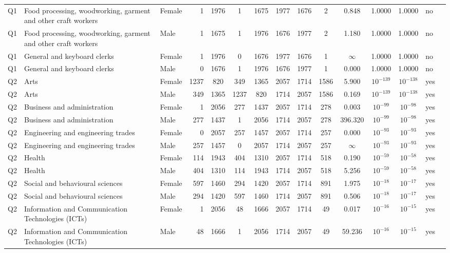 \begin{longtable}{lllrcccccccccll}
Q1 & Food processing, woodworking, garment and other craft workers & Female & 1 & 1976 & 1 & 1675 & 1977 & 1676 & 2 & 0.848 & 1.0000 & 1.0000 & no \\
Q1 & Food processing, woodworking, garment and other craft workers & Male & 1 & 1675 & 1 & 1976 & 1676 & 1977 & 2 & 1.180 & 1.0000 & 1.0000 & no \\
Q1 & General and keyboard clerks & Female & 1 & 1976 & 0 & 1676 & 1977 & 1676 & 1 & $\infty$ & 1.0000 & 1.0000 & no \\
Q1 & General and keyboard clerks & Male & 0 & 1676 & 1 & 1976 & 1676 & 1977 & 1 & 0.000 & 1.0000 & 1.0000 & no \\
Q2 & Arts & Female & 1237 & 820 & 349 & 1365 & 2057 & 1714 & 1586 & 5.900 & $10^{-139}$ & $10^{-138}$ & yes \\
Q2 & Arts & Male & 349 & 1365 & 1237 & 820 & 1714 & 2057 & 1586 & 0.169 & $10^{-139}$ & $10^{-138}$ & yes \\
Q2 & Business and administration & Female & 1 & 2056 & 277 & 1437 & 2057 & 1714 & 278 & 0.003 & $10^{-99}$ & $10^{-98}$ & yes \\
Q2 & Business and administration & Male & 277 & 1437 & 1 & 2056 & 1714 & 2057 & 278 & 396.320 & $10^{-99}$ & $10^{-98}$ & yes \\
Q2 & Engineering and engineering trades & Female & 0 & 2057 & 257 & 1457 & 2057 & 1714 & 257 & 0.000 & $10^{-93}$ & $10^{-93}$ & yes \\
Q2 & Engineering and engineering trades & Male & 257 & 1457 & 0 & 2057 & 1714 & 2057 & 257 & $\infty$ & $10^{-93}$ & $10^{-93}$ & yes \\
Q2 & Health & Female & 114 & 1943 & 404 & 1310 & 2057 & 1714 & 518 & 0.190 & $10^{-59}$ & $10^{-58}$ & yes \\
Q2 & Health & Male & 404 & 1310 & 114 & 1943 & 1714 & 2057 & 518 & 5.256 & $10^{-59}$ & $10^{-58}$ & yes \\
Q2 & Social and behavioural sciences & Female & 597 & 1460 & 294 & 1420 & 2057 & 1714 & 891 & 1.975 & $10^{-18}$ & $10^{-17}$ & yes \\
Q2 & Social and behavioural sciences & Male & 294 & 1420 & 597 & 1460 & 1714 & 2057 & 891 & 0.506 & $10^{-18}$ & $10^{-17}$ & yes \\
Q2 & Information and Communication Technologies (ICTs) & Female & 1 & 2056 & 48 & 1666 & 2057 & 1714 & 49 & 0.017 & $10^{-16}$ & $10^{-15}$ & yes \\
Q2 & Information and Communication Technologies (ICTs) & Male & 48 & 1666 & 1 & 2056 & 1714 & 2057 & 49 & 59.236 & $10^{-16}$ & $10^{-15}$ & yes \\

\end{longtable}

